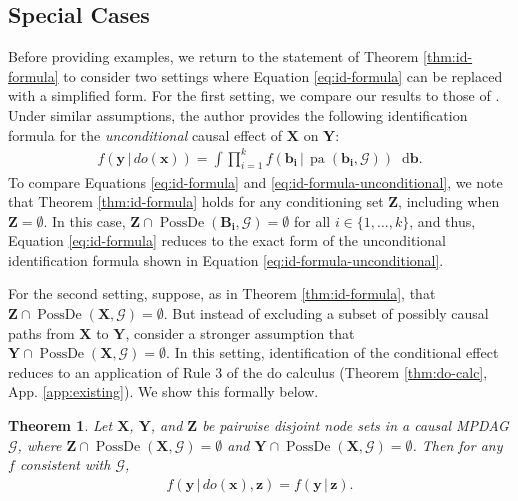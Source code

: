 \documentclass[11pt]{article}
\DeclareMathOperator{\pa}{pa}
\DeclareMathOperator{\PossDe}{PossDe}
\newtheorem{theorem}{Theorem}
\newcommand{\mb}[1]{\mathbf{#1}}
\newcommand{\g}[1][G]{\mathcal{#1}}
\newcommand*\diff{\mathop{}\!\mathrm{d}}
\begin{document}

\subsection{Special Cases}

Before providing examples, we return to the statement of Theorem \ref{thm:id-formula} to consider two settings where Equation \eqref{eq:id-formula} can be replaced with a simplified form. For the first setting, we compare our results to those of \cite{perkovic2020identifying}. Under similar assumptions, the author provides the following identification formula for the \textit{unconditional} causal effect of $\mb{X}$ on $\mb{Y}$:
\begin{align}
    f(\mb{y} \,|\, do(\mb{x})) = \int \prod_{i=1}^k f(\mb{b_i} \,|\, \pa(\mb{b_i},\g)) \diff \mb{b}. \label{eq:id-formula-unconditional}
\end{align}
To compare Equations \eqref{eq:id-formula} and \eqref{eq:id-formula-unconditional}, we note that Theorem \ref{thm:id-formula} holds for any conditioning set $\mb{Z}$, including when $\mb{Z} = \emptyset$. In this case, ${\mb{Z} \cap \PossDe(\mb{B_i}, \g) = \emptyset}$ for all $i \in \{1, \dots, k\}$, and thus, Equation \eqref{eq:id-formula} reduces to the exact form of the unconditional identification formula shown in Equation \eqref{eq:id-formula-unconditional}.



For the second setting, suppose, as in Theorem \ref{thm:id-formula}, that $\mb{Z} \cap \PossDe(\mb{X},\g) = \emptyset$. But instead of excluding a subset of possibly causal paths from $\mb{X}$ to $\mb{Y}$, consider a stronger assumption that $\mb{Y} \cap \PossDe(\mb{X},\g) = \emptyset$. In this setting, identification of the conditional effect reduces to an application of Rule 3 of the do calculus (Theorem \ref{thm:do-calc}, App. \ref{app:existing}). We show this formally below.

\begin{theorem}
\label{thm:id-rule3}
    Let $\mb{X}$, $\mb{Y}$, and $\mb{Z}$ be pairwise disjoint node sets in a causal MPDAG $\g$, where $\mb{Z} \cap \PossDe(\mb{X},\g) = \emptyset$ and $\mb{Y} \cap \PossDe(\mb{X},\g) = \emptyset$. Then for any $f$ consistent with $\g$,
    \begin{align}
        f(\mb{y} \,|\, do(\mb{x}),\mb{z}) = f(\mb{y} \,|\, \mb{z}). \label{eq:id-formula-rule3}
    \end{align}
\end{theorem}
\end{document}
